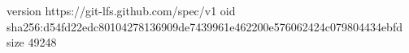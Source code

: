 version https://git-lfs.github.com/spec/v1
oid sha256:d54fd22edc80104278136909de7439961e462200e576062424c079804434ebfd
size 49248
